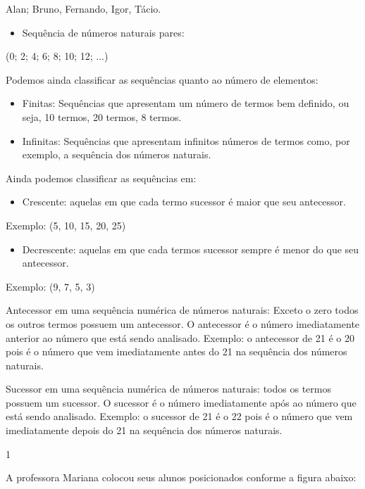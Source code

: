 Alan; Bruno, Fernando, Igor, Tácio.

\begin{itemize}
\item
  Sequência de números naturais pares:
\end{itemize}

(0; 2; 4; 6; 8; 10; 12; ...)

Podemos ainda classificar as sequências quanto ao número de elementos:

\begin{itemize}
\item
  Finitas: Sequências que apresentam um número de termos bem definido,
  ou seja, 10 termos, 20 termos, 8 termos.
\item
  Infinitas: Sequências que apresentam infinitos números de termos como,
  por exemplo, a sequência dos números naturais.
\end{itemize}

Ainda podemos classificar as sequências em:

\begin{itemize}
\item
  Crescente: aquelas em que cada termo sucessor é maior que seu
  antecessor.
\end{itemize}

Exemplo: (5, 10, 15, 20, 25)

\begin{itemize}
\item
  Decrescente: aquelas em que cada termos sucessor sempre é menor do que
  seu antecessor.
\end{itemize}

Exemplo: (9, 7, 5, 3)

Antecessor em uma sequência numérica de números naturais: Exceto o zero
todos os outros termos possuem um antecessor. O antecessor é o número
imediatamente anterior ao número que está sendo analisado. Exemplo: o
antecessor de 21 é o 20 pois é o número que vem imediatamente antes do
21 na sequência dos números naturais.

Sucessor em uma sequência numérica de números naturais: todos os termos
possuem um sucessor. O sucessor é o número imediatamente após ao número
que está sendo analisado. Exemplo: o sucessor de 21 é o 22 pois é o
número que vem imediatamente depois do 21 na sequência dos números
naturais.


\num{1}

A professora Mariana colocou seus alunos posicionados conforme a figura
abaixo:

